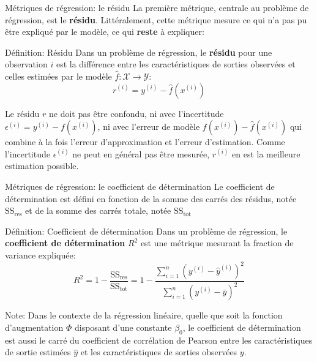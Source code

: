 \begin{frame}{Métriques de régression: le résidu}
	La première métrique, centrale au problème de régression, est le \textbf{résidu}. Littéralement, cette métrique mesure ce qui n'a pas pu être expliqué par le modèle, ce qui \textbf{reste} à expliquer:
	\begin{block}{Définition: Résidu}
		Dans un problème de régression, le \textbf{résidu} pour une observation $i$ est la différence entre les caractéristiques de sorties observées et celles estimées par le modèle $\hat{f}: \mathcal{X} \to \mathcal{Y}$:
		\begin{equation}
			r^{(i)} = y^{(i)} - \hat{f}(x^{(i)})
			\nonumber
		\end{equation}
	\end{block}
	\pause
	Le résidu $r$ ne doit pas être confondu, ni avec l'incertitude $\epsilon^{(i)} = y^{(i)} - f(x^{(i)})$, ni avec l'erreur de modèle $f(x^{(i)}) - \hat{f}(x^{(i)})$ qui combine à la fois l'erreur d'approximation et l'erreur d'estimation. Comme l'incertitude $\epsilon^{(i)}$ ne peut en général pas être mesurée, $r^{(i)}$ en est la meilleure estimation possible.
\end{frame}

\begin{frame}{Métriques de régression: le coefficient de détermination}
	Le coefficient de détermination est défini en fonction de la somme des carrés des résidus, notée $\text{SS}_{\text{res}}$ et de la somme des carrés totale, notée $\text{SS}_{\text{tot}}$ 
	\begin{block}{Définition: Coefficient de détermination}
		Dans un problème de régression, le \textbf{coefficient de détermination} $R^2$ est une métrique mesurant la fraction de variance expliquée:
		\begin{equation}
			R^2 = 1 - \frac{\text{SS}_{\text{res}}}{\text{SS}_{\text{tot}}} = 1 - \frac{\sum_{i=1}^n \left(y^{(i)} - \hat{y}^{(i)}\right)^2}{\sum_{i=1}^n \left(y^{(i)} - \bar{y}\right)^2}
			\nonumber
		\end{equation}
	\end{block}
	\pause
	Note: Dans le contexte de la régression linéaire, quelle que soit la fonction d'augmentation $\Phi$ disposant d'une constante $\beta_0$, le coefficient de détermination est aussi le carré du coefficient de corrélation de Pearson entre les caractéristiques de sortie estimées $\hat{y}$ et les caractéristiques de sorties observées $y$.
\end{frame}

